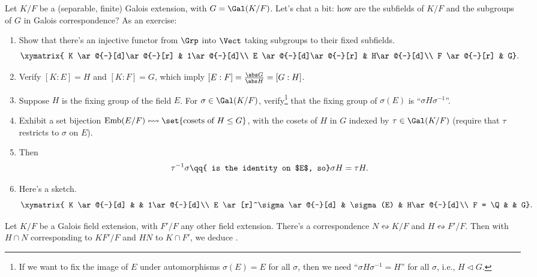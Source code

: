 \begin{rem}
    Let $K/F$ be a (separable, finite) Galois extension, with $G = \Gal(K/F)$. Let's chat a bit: how are the subfields of $K/F$ and the subgroups of $G$ in Galois correspondence? As an exercise:

    \begin{enumerate}
        \item Show that there's an injective functor from $\Grp$ into $\Vect$ taking subgroups to their fixed subfields.
        \[
            \xymatrix{
                K \ar@{-}[d]\ar@{-}[r] & 1\ar@{-}[d]\\
                E \ar@{-}[d]\ar@{-}[r] & H\ar@{-}[d]\\
                F \ar@{-}[r]  & G}
        .\]

        \item Verify $[K:E] = H$ and $[K:F] = G$, which imply $[E:F] = \frac { \abs G } {\abs H} = [G:H]$.

        \item Suppose $H$ is the fixing group of the field $E$. For $\sigma \in \Gal(K/F)$, verify\footnote{If we want to fix the image of $E$ under automorphisms  $\sigma(E) = E$ for all $\sigma$, then we need ``$\sigma H \sigma^{-1} = H$'' for all $\sigma$, i.e., $H \triangleleft G$.} that the fixing group of $\sigma(E)$ is ``$\sigma H \sigma^{-1}$''.
        \item Exhibit a set bijection $\mathrm{Emb} (E/F) \leftrightsquigarrow \set{ \text{cosets of } H \le G }$, with the cosets of $H$ in $G$ indexed by $\tau \in \Gal(K/F)$ (require that $\tau$ restricts to $\sigma$ on $E$).
        \item Then 
      \[
          \tau^{-1} \sigma \qq{ is the identity on $E$, so} \sigma H = \tau H.
      \]

    \item Here's a sketch.
    \[
        \xymatrix{
            K \ar@{-}[d] & & 1\ar@{-}[d]\\
            E \ar[r]^\sigma \ar@{-}[d] & \sigma(E) & H\ar@{-}[d]\\
        F = \Q & & G}
    .\]
    \end{enumerate}
\end{rem}

\begin{prop}
    Let $K/F$ be a Galois field extension, with $F'/F$ any other field extension. 
    There's a correspondence $N \leftrightsquigarrow K/F$ and $H \leftrightsquigarrow F'/F$. Then with $H \cap N$ corresponding to $KF'/F$ and $HN$ to $K \cap F'$, we deduce \TODO.
\end{prop}

